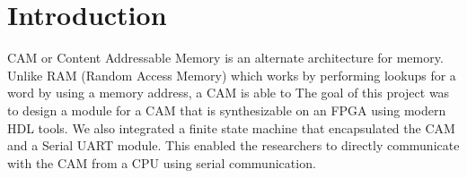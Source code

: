 \section{Introduction}
CAM or Content Addressable Memory is an alternate architecture for memory. Unlike RAM (Random Access Memory) which works by performing lookups for a word by using a memory address, a CAM is able to 
The goal of this project was to design a module for a CAM that is synthesizable on an FPGA using modern HDL tools. 
We also integrated a finite state machine that encapsulated the CAM and a Serial UART module. 
This enabled the researchers to directly communicate with the CAM from a CPU using serial communication. 
